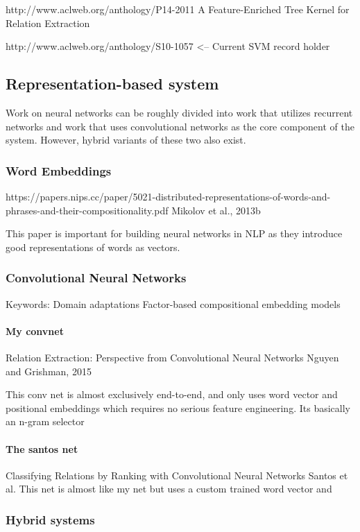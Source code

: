 http://www.aclweb.org/anthology/P14-2011
A Feature-Enriched Tree Kernel for Relation Extraction


http://www.aclweb.org/anthology/S10-1057 <-- Current SVM record holder

\subsection{Representation-based system}

Work on neural networks can be roughly divided into work that utilizes recurrent networks and work that uses convolutional networks as the core component of the system. However, hybrid variants of these two also exist.


\subsubsection{Word Embeddings}
https://papers.nips.cc/paper/5021-distributed-representations-of-words-and-phrases-and-their-compositionality.pdf
Mikolov et al., 2013b

This paper is important for building neural networks in NLP as they introduce good representations of words as vectors.


\subsubsection{Convolutional Neural Networks}

Keywords: 
Domain adaptations
Factor-based compositional embedding
models


\paragraph{My convnet}
Relation Extraction:
Perspective from Convolutional Neural Networks
Nguyen and Grishman, 2015

This conv net is almost exclusively end-to-end, and only uses word vector and positional 
embeddings which requires no serious feature engineering.
Its basically an n-gram selector

\paragraph{The santos net}
Classifying Relations by Ranking with Convolutional Neural Networks
Santos et al.
This net is almost like my net but uses a custom trained word vector and 


\subsubsection{Hybrid systems}

